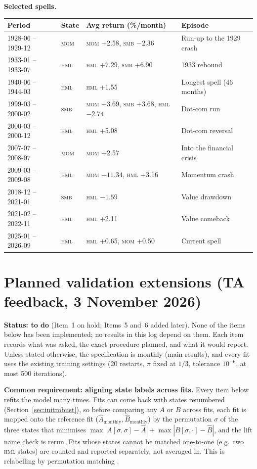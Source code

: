 \documentclass[11pt]{article}
\newcommand{\SMB}{\textsc{smb}}
\newcommand{\HML}{\textsc{hml}}
\newcommand{\MOM}{\textsc{mom}}
\begin{document}
\textbf{Selected spells.}
\begin{center}
\small
\begin{tabular}{llll}
\toprule
Period & State & Avg return (\%/month) & Episode \\
\midrule
1928-06 -- 1929-12 & \MOM & \MOM{} +2.58, \SMB{} $-2.36$ & Run-up to the 1929 crash \\
1933-01 -- 1933-07 & \HML & \HML{} +7.29, \SMB{} +6.90 & 1933 rebound \\
1940-06 -- 1944-03 & \HML & \HML{} +1.55 & Longest spell (46 months) \\
1999-03 -- 2000-02 & \SMB & \MOM{} +3.69, \SMB{} +3.68, \HML{} $-2.74$ & Dot-com run \\
2000-03 -- 2000-12 & \HML & \HML{} +5.08 & Dot-com reversal \\
2007-07 -- 2008-07 & \MOM & \MOM{} +2.57 & Into the financial crisis \\
2009-03 -- 2009-08 & \HML & \MOM{} $-11.34$, \HML{} +3.16 & Momentum crash \\
2018-12 -- 2021-01 & \SMB & \HML{} $-1.59$ & Value drawdown \\
2021-02 -- 2022-11 & \HML & \HML{} +2.11 & Value comeback \\
2025-01 -- 2026-09 & \HML & \HML{} +0.65, \MOM{} +0.50 & Current spell \\
\bottomrule
\end{tabular}
\end{center}

\section{Planned validation extensions (TA feedback, 3 November 2026)}\label{sec:tafeedback}

\textbf{Status: to do} (Item~1 on hold; Items~5 and~6 added later). None of the items below has been implemented; no results in this log depend on them. Each item records what was asked, the exact procedure planned, and what it would report. Unless stated otherwise, the specification is monthly (main results), and every fit uses the existing training settings (20 restarts, $\pi$ fixed at $1/3$, tolerance $10^{-6}$, at most 500 iterations).

\textbf{Common requirement: aligning state labels across fits.} Every item below refits the model many times. Fits can come back with states renumbered (Section~\ref{sec:initrobust}), so before comparing any $A$ or $B$ across fits, each fit is mapped onto the reference fit ($\hat A_{\text{monthly}},\hat B_{\text{monthly}}$) by the permutation $\sigma$ of the three states that minimises $\max|A[\sigma,\sigma]-\hat A|+\max|B[\sigma,\cdot]-\hat B|$, and the lift name check is rerun. Fits whose states cannot be matched one-to-one (e.g.\ two \HML{} states) are counted and reported separately, not averaged in. This is relabelling by permutation matching \citep{stephens2000}.
\end{document}
